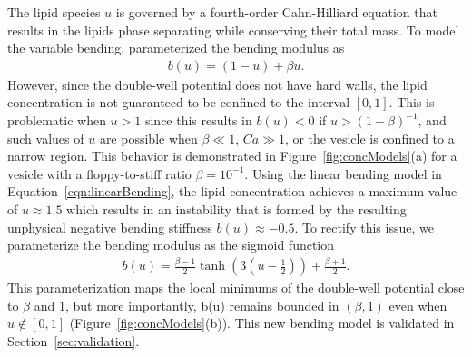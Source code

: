 \documentclass[twoside,twocolumn,9pt]{article}
\begin{document}
The lipid species $u$ is governed by a fourth-order Cahn-Hilliard
equation that results in the lipids phase separating while conserving
their total mass. To model the variable bending,
\citet{soh-tse-li-voi-low2010} parameterized the bending modulus as
\begin{align}
  \label{eqn:linearBending}
  b(u) = (1-u) + \beta u.
\end{align}
However, since the double-well potential does not have hard walls, the
lipid concentration is not guaranteed to be confined to the interval
$[0,1]$. This is problematic when $u > 1$ since this results in $b(u) <
0$ if $u > (1 - \beta)^{-1}$, and such values of $u$ are possible when
$\beta \ll 1$, $Ca \gg 1$, or the vesicle is confined to a narrow
region. This behavior is demonstrated in Figure~\ref{fig:concModels}(a)
for a vesicle with a floppy-to-stiff ratio $\beta = 10^{-1}$. Using the
linear bending model in Equation~\eqref{eqn:linearBending}, the lipid
concentration achieves a maximum value of $u \approx 1.5$ which results
in an instability that is formed by the resulting unphysical negative
bending stiffness $b(u) \approx -0.5$. To rectify this issue, we
parameterize the bending modulus as the sigmoid function
\begin{align}
  b(u) = \frac{\beta-1}{2} \tanh\left(3\left(u-\frac{1}{2} 
    \right)\right) + \frac{\beta + 1}{2}.
  \label{eqn:tanhBending}
\end{align}
This parameterization maps the local minimums of the double-well
potential close to $\beta$ and $1$, but more importantly, b(u) remains
bounded in $(\beta,1)$ even when $u \notin [0,1]$
(Figure~\ref{fig:concModels}(b)). This new bending model is validated in
Section~\ref{sec:validation}.
\end{document}

